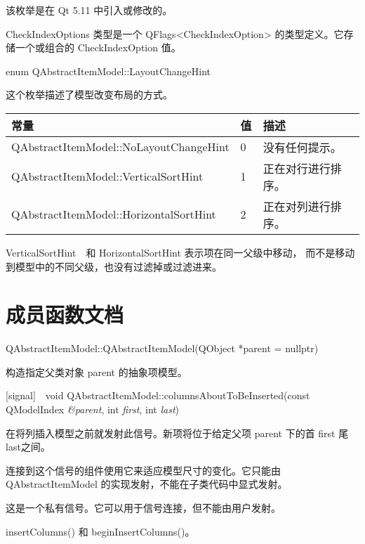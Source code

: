 该枚举是在 Qt 5.11 中引入或修改的。

CheckIndexOptions 类型是一个 QFlags<CheckIndexOption> 的类型定义。它存储一个或组合的 CheckIndexOption 值。

\splitLine

enum QAbstractItemModel::LayoutChangeHint

这个枚举描述了模型改变布局的方式。

\begin{tabular}{|l|l|l|}
\hline
常量 &值&描述\\
\hline
QAbstractItemModel::NoLayoutChangeHint&	0&	没有任何提示。\\
\hline
QAbstractItemModel::VerticalSortHint&	1&	正在对行进行排序。\\
\hline
QAbstractItemModel::HorizontalSortHint&	2&	正在对列进行排序。\\
\hline
\end{tabular}


\begin{notice}
VerticalSortHint　和 HorizontalSortHint 表示项在同一父级中移动，
而不是移动到模型中的不同父级，也没有过滤掉或过滤进来。
\end{notice}

\splitLine

\section{成员函数文档}

QAbstractItemModel::QAbstractItemModel(QObject *parent = nullptr)

构造指定父类对象 parent 的抽象项模型。

[signal] void QAbstractItemModel::columnsAboutToBeInserted(const QModelIndex \emph{\&parent}, int \emph{first}, int \emph{last})

在将列插入模型之前就发射此信号。新项将位于给定父项 parent 下的首 first 尾 last之间。

\begin{notice}
	连接到这个信号的组件使用它来适应模型尺寸的变化。它只能由 QAbstractItemModel 的实现发射，不能在子类代码中显式发射。
\end{notice}

\begin{notice}
这是一个私有信号。它可以用于信号连接，但不能由用户发射。
\end{notice}

\begin{seeAlso}
insertColumns() 和 beginInsertColumns()。
\end{seeAlso}

